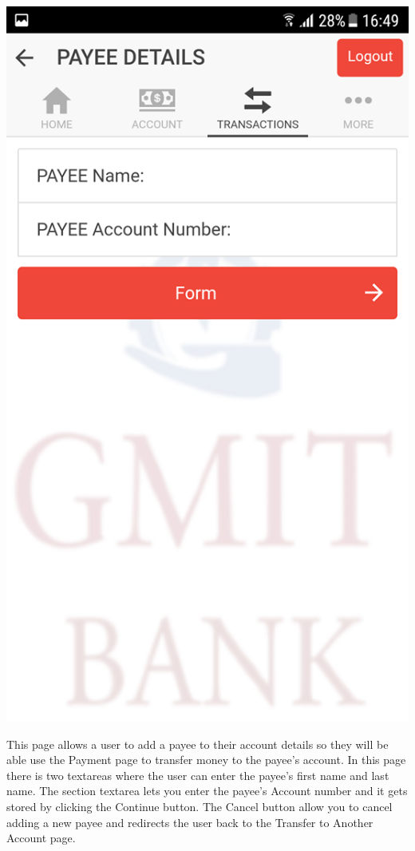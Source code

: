 \begin{center}
    \includegraphics[scale=0.5]{img/13payeeempty.png}
\end{center}
This page allows a user to add a payee to their account details so they will be able use the Payment page to transfer money to the payee’s account. In this page there is two textareas where the user can enter the payee’s first name and last name. The section textarea lets you enter the payee’s Account number and it gets stored by clicking the Continue button. The Cancel button allow you to cancel adding a new payee and redirects the user back to the Transfer to Another Account page.
